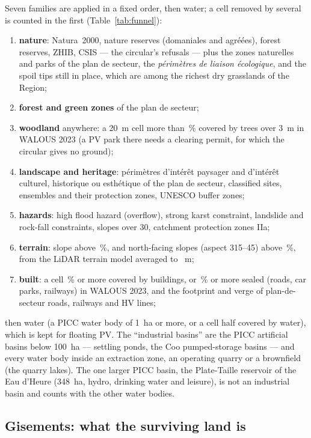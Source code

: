 \documentclass[11pt,a4paper]{article}
\begin{document}
Seven families are applied in a fixed order, then water; a cell removed by
several is counted in the first (Table~\ref{tab:funnel}):
\begin{enumerate}
\item \textbf{nature}: Natura~2000, nature reserves (domaniales and agréées),
  forest reserves, ZHIB, CSIS --- the circular's refusals --- plus the zones
  naturelles and parks of the plan de secteur, the \emph{périmètres de liaison
  écologique}, and the spoil tips still in place, which are among the richest
  dry grasslands of the Region;
\item \textbf{forest and green zones} of the plan de secteur;
\item \textbf{woodland} anywhere: a 20~m cell more than \TreesPct{}\,\% covered by
  trees over 3~m in WALOUS 2023 (a PV park there needs a clearing permit, for
  which the circular gives no ground);
\item \textbf{landscape and heritage}: périmètres d'intérêt paysager and
  d'intérêt culturel, historique ou esthétique of the plan de secteur, classified
  sites, ensembles and their protection zones, UNESCO buffer zones;
\item \textbf{hazards}: high flood hazard (overflow), strong karst constraint,
  landslide and rock-fall constraints, slopes over 30\textdegree{}, catchment protection
  zones IIa;
\item \textbf{terrain}: slope above \SlopeMax{}\,\%, and north-facing slopes
  (aspect 315\textdegree{}--45\textdegree{}) above \NorthMax{}\,\%, from the LiDAR terrain model averaged
  to \GridRes{}~m;
\item \textbf{built}: a cell \BuiltPct{}\,\% or more covered by buildings, or
  \SealedPct{}\,\% or more sealed (roads, car parks, railways) in WALOUS 2023,
  and the footprint and verge of plan-de-secteur roads, railways and HV lines;
\end{enumerate}
then water (a PICC water body of 1~ha or more, or a cell half covered by water),
which is kept for floating PV. The ``industrial basins'' are the PICC artificial
basins below 100~ha --- settling ponds, the Coo pumped-storage basins --- and
every water body inside an extraction zone, an operating quarry or a brownfield
(the quarry lakes). The one larger PICC basin, the Plate-Taille reservoir of the
Eau d'Heure (348~ha, hydro, drinking water and leisure), is not an industrial
basin and counts with the other water bodies.

\subsection{Gisements: what the surviving land is}
\end{document}
